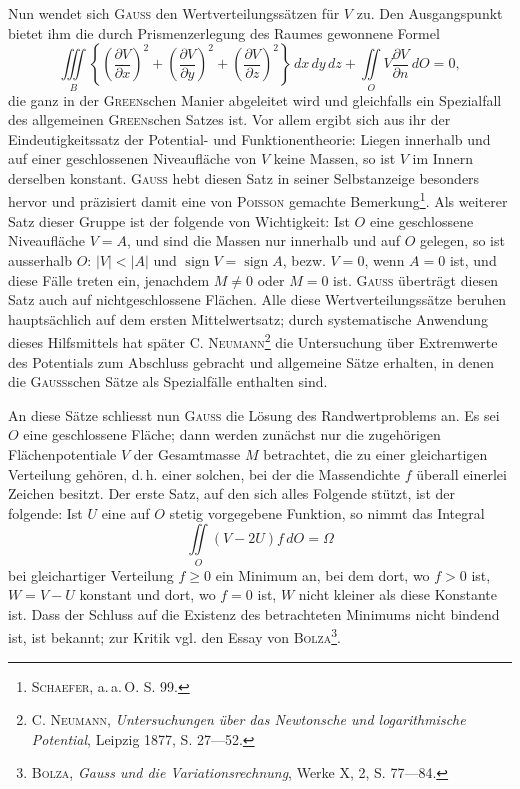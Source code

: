 Nun wendet sich \textsc{Gauss} den Wertverteilungssätzen für \(V\) zu. Den Ausgangspunkt
bietet ihm die durch Prismenzerlegung des Raumes gewonnene
Formel
\begingroup\small
\[
\iiint\limits_B\left\{\left(\frac{\partial V}{\partial x}\right)^2+\left(\frac{\partial V}{\partial y}\right)^2+\left(\frac{\partial V}{\partial z}\right)^2\right\}\,dx\,dy\,dz
+\iint\limits_O V\frac{\partial V}{\partial n}\,dO=0,\tag{17}
\]
\endgroup
\noindent die ganz in der \textsc{Green}schen Manier abgeleitet wird und gleichfalls ein Spezialfall
des allgemeinen \textsc{Green}schen Satzes ist. Vor allem ergibt sich aus ihr der
Eindeutigkeitssatz der Potential- und Funktionentheorie: Liegen innerhalb und
auf einer geschlossenen Niveaufläche von \(V\) keine Massen, so ist \(V\) im Innern
derselben konstant. \textsc{Gauss} hebt diesen Satz in seiner Selbstanzeige besonders
hervor und präzisiert damit eine von \textsc{Poisson} gemachte Bemerkung\footnote{\textsc{Schaefer}, a.\,a.\,O. S. 99.}. Als weiterer
Satz dieser Gruppe ist der folgende von Wichtigkeit: Ist \(O\) eine geschlossene
Niveaufläche \(V=A\), und sind die Massen nur innerhalb und auf \(O\) gelegen, so
ist ausserhalb \(O\): \(|V|<|A|\) und \(\operatorname{sign}V=\operatorname{sign}A\), bezw. \(V=0\), wenn \(A=0\)
\clearpage{}
\noindent ist, und diese Fälle treten ein, jenachdem \(M\neq0\) oder \(M=0\) ist. \textsc{Gauss} überträgt
diesen Satz auch auf nichtgeschlossene Flächen. Alle diese Wertverteilungssätze
beruhen hauptsächlich auf dem ersten Mittelwertsatz; durch
systematische Anwendung dieses Hilfsmittels hat später \textsc{C. Neumann}\footnote{\textsc{C. Neumann}, \textit{Untersuchungen über das Newtonsche und logarithmische Potential}, Leipzig 1877,
S. 27—52.} die
Untersuchung über Extremwerte des Potentials zum Abschluss gebracht und
allgemeine Sätze erhalten, in denen die \textsc{Gauss}schen Sätze als Spezialfälle enthalten
sind.

An diese Sätze schliesst nun \textsc{Gauss} die Lösung des Randwertproblems
an. Es sei \(O\) eine geschlossene Fläche; dann werden zunächst nur die zugehörigen
Flächenpotentiale \(V\) der Gesamtmasse \(M\) betrachtet, die zu einer
gleichartigen Verteilung gehören, d.\,h. einer solchen, bei der die Massendichte
\(f\) überall einerlei Zeichen besitzt. Der erste Satz, auf den sich alles Folgende
stützt, ist der folgende: Ist \(U\) eine auf \(O\) stetig vorgegebene Funktion, so
nimmt das Integral
\[
\iint\limits_O(V-2U)f\,dO=\Omega\tag{18}
\]
\noindent bei gleichartiger Verteilung \(f\geq0\) ein Minimum an, bei dem dort, wo \(f>0\)
ist, \(W=V-U\) konstant und dort, wo \(f=0\) ist, \(W\) nicht kleiner als diese
Konstante ist. Dass der Schluss auf die Existenz des betrachteten Minimums
nicht bindend ist, ist bekannt; zur Kritik vgl. den Essay von \textsc{Bolza}\footnote{\textsc{Bolza}, \textit{Gauss und die Variationsrechnung}, Werke X, 2, S. 77—84.}.


